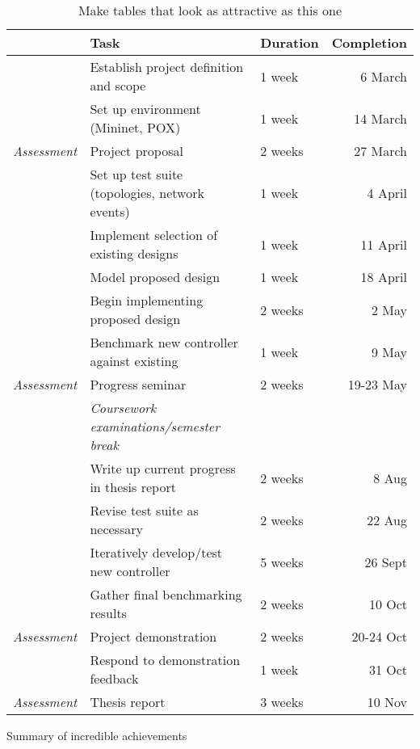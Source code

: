 \begin{table}[H]
  \begin{center}
    \begin{tabular}{@{}rllr@{}}
      \toprule
      & Task & Duration & Completion\\
      \midrule
      & Establish project definition and scope & 1 week & 6 March \\
      & Set up environment (Mininet,  POX) & 1 week & 14 March \\
      \emph{Assessment} & Project proposal & 2 weeks & 27 March \\
      & Set up test suite (topologies, network events) & 1 week & 4 April \\
      & Implement selection of existing designs & 1 week & 11 April \\
      & Model proposed design & 1 week & 18 April \\
      & Begin implementing proposed design & 2 weeks & 2 May \\
      & Benchmark new controller against existing & 1 week & 9 May \\
      \emph{Assessment} & Progress seminar & 2 weeks & 19-23 May \\
      \addlinespace
      & \emph{Coursework examinations/semester break} \\
      \addlinespace
      & Write up current progress in thesis report & 2 weeks & 8 Aug\\
      & Revise test suite as necessary & 2 weeks & 22 Aug\\
      & Iteratively develop/test new controller & 5 weeks & 26 Sept\\
      & Gather final benchmarking results & 2 weeks & 10 Oct \\
      \emph{Assessment} & Project demonstration & 2 weeks & 20-24 Oct \\
      & Respond to demonstration feedback & 1 week & 31 Oct \\
      \emph{Assessment} & Thesis report & 3 weeks & 10 Nov \\
      \bottomrule
    \end{tabular}
    \caption{Make tables that look as attractive as this one}
    \label{table:schedule}
  \end{center}
\end{table}

\begin{table}
\caption{Summary of incredible achievements}
\end{table}

